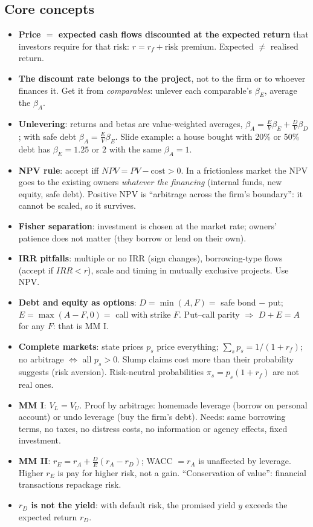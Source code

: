 \documentclass[10pt,a4paper]{article}
\newcommand{\blk}[1]{\subsection*{\color{hd}#1}}
\begin{document}
\blk{Core concepts}
\begin{itemize}
  \item \textbf{Price $=$ expected cash flows discounted at the expected return} that investors require
        for that risk: $r=r_f+\text{risk premium}$. Expected $\ne$ realised return.
  \item \textbf{The discount rate belongs to the project}, not to the firm or to whoever finances it.
        Get it from \emph{comparables}: unlever each comparable's $\beta_E$, average the $\beta_A$.
  \item \textbf{Unlevering}: returns and betas are value-weighted averages,
        $\beta_A=\frac EV\beta_E+\frac DV\beta_D$; with safe debt $\beta_A=\frac EV\beta_E$.
        Slide example: a house bought with 20\% or 50\% debt has $\beta_E=1.25$ or $2$ with the same
        $\beta_A=1$.
  \item \textbf{NPV rule}: accept iff $NPV=PV-\text{cost}>0$. In a frictionless market the NPV goes to
        the existing owners \emph{whatever the financing} (internal funds, new equity, safe debt).
        Positive NPV is ``arbitrage across the firm's boundary'': it cannot be scaled, so it survives.
  \item \textbf{Fisher separation}: investment is chosen at the market rate; owners' patience does not
        matter (they borrow or lend on their own).
  \item \textbf{IRR pitfalls}: multiple or no IRR (sign changes), borrowing-type flows (accept if
        $IRR<r$), scale and timing in mutually exclusive projects. Use NPV.
  \item \textbf{Debt and equity as options}: $D=\min(A,F)=$ safe bond $-$ put; $E=\max(A-F,0)=$ call
        with strike $F$. Put--call parity $\Rightarrow$ $D+E=A$ for any $F$: that is MM I.
  \item \textbf{Complete markets}: state prices $p_s$ price everything; $\sum_s p_s=1/(1+r_f)$; no
        arbitrage $\Leftrightarrow$ all $p_s>0$. Slump claims cost more than their probability
        suggests (risk aversion). Risk-neutral probabilities $\pi_s=p_s(1+r_f)$ are not real ones.
  \item \textbf{MM I}: $V_L=V_U$. Proof by arbitrage: homemade leverage (borrow on personal account)
        or undo leverage (buy the firm's debt). Needs: same borrowing terms, no taxes, no distress
        costs, no information or agency effects, fixed investment.
  \item \textbf{MM II}: $r_E=r_A+\frac DE(r_A-r_D)$; WACC $=r_A$ is unaffected by leverage. Higher
        $r_E$ is pay for higher risk, not a gain. ``Conservation of value'': financial transactions
        repackage risk.
  \item \textbf{$r_D$ is not the yield}: with default risk, the promised yield $y$ exceeds the expected
        return $r_D$.
\end{itemize}
\end{document}
